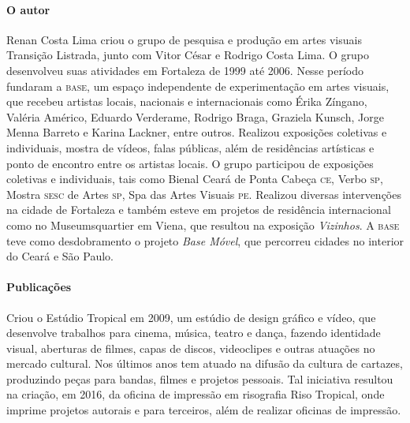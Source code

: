 \documentclass[11pt]{extarticle}
\begin{document}
\reversemarginpar
\marginparwidth=5cm



\paragraph{O autor} Renan Costa Lima criou o grupo de pesquisa e produção em artes visuais Transição Listrada, junto com Vitor César e Rodrigo Costa Lima. O grupo desenvolveu suas atividades em Fortaleza de 1999 até 2006. Nesse período fundaram a \textsc{base}, um espaço independente de experimentação em artes visuais, que recebeu artistas locais, nacionais e internacionais como Érika Zíngano, Valéria Américo, Eduardo Verderame, Rodrigo Braga, Graziela Kunsch, Jorge Menna Barreto e Karina Lackner, entre outros. Realizou exposições coletivas e individuais, mostra de vídeos, falas públicas, além de residências artísticas e ponto de encontro entre os artistas locais. O grupo participou de exposições coletivas e individuais, tais como Bienal Ceará de Ponta Cabeça \textsc{ce}, Verbo \textsc{sp}, Mostra \textsc{sesc} de Artes \textsc{sp}, Spa das Artes Visuais \textsc{pe}. Realizou diversas intervenções na cidade de Fortaleza e também esteve em projetos de residência internacional como no Museumsquartier em Viena, que resultou na exposição \textit{Vizinhos}. A \textsc{base} teve como desdobramento o projeto \textit{Base Móvel}, que percorreu cidades no interior do Ceará e São Paulo. 



\paragraph{Publicações} Criou o Estúdio Tropical em 2009, um estúdio de design gráfico e vídeo, que desenvolve trabalhos para cinema, música, teatro e dança, fazendo identidade visual, aberturas de filmes, capas de discos, videoclipes e outras atuações no mercado cultural. Nos últimos anos tem atuado na difusão da cultura de cartazes, produzindo peças para bandas, filmes e projetos pessoais. Tal iniciativa resultou na criação, em 2016, da oficina de impressão em risografia Riso Tropical, onde imprime projetos autorais e para terceiros, além de realizar oficinas de impressão.
\end{document}
